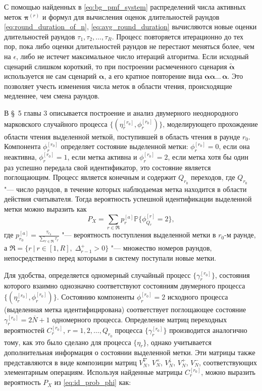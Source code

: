 С помощью найденных в \eqref{eq:bg_pmf_system} распределений числа активных меток $\bm{\pi}^{(r)}$ и формул для вычисления оценок длительностей раундов \eqref{eq:round_duration_of_n}, \eqref{eq:avg_round_duration} вычисляются новые оценки длительностей раундов $\tau_1, \tau_2, \dots, \tau_R$. Процесс повторяется итерационно до тех пор, пока либо оценки длительностей раундов не перестают меняться более, чем на $\epsilon$, либо не истечет максимальное число итераций алгоритма. Если исходный сценарий слишком короткий, то при построении расмеченного сценария $\widetilde{\bm{\alpha}}$ используется не сам сценарий $\bm{\alpha}$, а его кратное повторение вида $\bm{\alpha} \bm{\alpha} \dots\, \bm{\alpha}$. Это позволяет учесть изменения числа меток в области чтения, происходящие медленнее, чем смена раундов.

В \S~5 главы 3 описывается построение и анализ двумерного неоднородного марковского случайного процесса $\{ (\eta_r^{[r_0]}, \phi_r^{[r_0]}) \}$, моделирующего прохождение области чтения выделенной меткой, поступившей в область чтения в раунде $r_0$. Компонента $\phi_r^{[r_0]}$ определяет состояние выделенной метки: $\phi_r^{[r_0]} = 0$, если она неактивна, $\phi_r^{[r_0]} = 1$, если метка активна и $\phi_r^{[r_0]} = 2$, если метка хотя бы один раз успешно передала свой идентификатор, это состояние является поглощающим. Процесс является конечным и содержит $Q_{r_0}$ переходов, где $Q_{r_0}$ "--- число раундов, в течение которых наблюдаемая метка находится в области действия считывателя. Тогда вероятность успешной идентификации выделенной метки можно выразить как
\begin{equation}\label{eq:id_prob_phi}
  P_X = \sum\limits_{r \in \mathfrak{R}} p^{[a]}_r \mathbb{P}\{ \phi^{[r]}_{Q_r} = 2 \},
\end{equation}
где $p^{[a]}_{r_0} = \frac{\tau_{r_0}}{\sum_{r \in \mathfrak{R}} \tau_r}$ "--- вероятность поступления выделенной метки в $r_0$-м раунде, а $\mathfrak{R} = \{ r\:|\:r \in [1, R],\; \Delta_{r-1}^+ > 0 \}$ "--- множество номеров раундов, непосредственно перед которыми в систему поступали новые метки.

Для удобства, определяется одномерный случайный процесс $\{ \gamma_r^{[r_0]} \}$, состояния которого взаимно однозначно соответствуют состояниям двумерного процесса $\{ (\eta_r^{[r_0]}, \phi_r^{[r_0]}) \}$. Состоянию компоненты $\phi_r^{[r_0]} = 2$ исходного процесса (выделенная метка идентифицирована) соответствует поглощающее состояние $\gamma_r^{[r_0]} = 2\overline{N}+1$ одномерного процесса. Определение матриц переходных вероятностей $C_r^{[r_0]}$, $r = 1, 2, \dots, Q_{r_0}$ процесса $\{ \gamma_r^{[r_0]} \}$ производится аналогично тому, как это было сделано для процесса $\{ \eta_r \}$, однако учитывается дополнительная информация о состоянии выделенной метки. Эти матрицы также представляются в виде композиции матриц $V^\nabla_N$, $V^\times_N$, $V^\downarrow_N$, $V^+_N$, $V^-_N$, соответствующих элементарным операциям. Используя найденные матрицы $C_r^{[r_0]}$, можно выразить вероятность $P_X$ из \eqref{eq:id_prob_phi} как:

